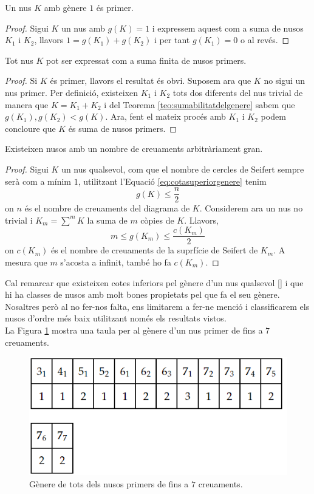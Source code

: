 \begin{corolary}
	Un nus $K$ amb gènere $1$ és primer.
\end{corolary}

\begin{proof}
	Sigui $K$ un nus amb $g(K)=1$ i expressem aquest com a suma de nusos $K_1$ i $K_2$, llavors $1=g(K_1)+g(K_2)$ i per tant $g(K_1)=0$ o al revés.
\end{proof}

\begin{corolary}
	Tot nus $K$ pot ser expressat com a suma finita de nusos primers.
\end{corolary}

\begin{proof}
	Si $K$ és primer, llavors el resultat és obvi. Suposem ara que $K$ no sigui un nus primer. Per definició, existeixen $K_1$ i $K_2$ tots dos diferents del nus trivial de manera que $K=K_1+K_2$ i del Teorema \ref{teo:sumabilitatdelgenere} sabem que $g(K_1),g(K_2)<g(K)$. Ara, fent el mateix procés amb $K_1$ i $K_2$ podem concloure que $K$ és suma de nusos primers.
\end{proof}

\begin{corolary}
	Existeixen nusos amb un nombre de creuaments arbitràriament gran.
\end{corolary}

\begin{proof}
	Sigui $K$ un nus qualsevol, com que el nombre de cercles de Seifert sempre serà com a mínim $1$, utilitzant l'Equació \ref{eq:cotasuperiorgenere} tenim $$g(K)\leq \frac{n}{2}$$ on $n$ és el nombre de creuaments del diagrama de $K$. Considerem ara un nus no trivial i $K_m=\sum^{m}K$ la suma de $m$ còpies de $K$. Llavors, $$m\leq g(K_m)\leq \frac{c(K_m)}{2}$$ on $c(K_m)$ és el nombre de creuaments de la suprfície de Seifert de $K_m$. A mesura que $m$ s'acosta a infinit, també ho fa $c(K_m)$.
\end{proof}

Cal remarcar que existeixen cotes inferiors pel gènere d'un nus qualsevol [\cite{lowerbound}] i que hi ha classes de nusos amb molt bones propietats pel que fa el seu gènere. Nosaltres però al no fer-nos falta, ens limitarem a fer-ne menció i classificarem els nusos d'ordre més baix utilitzant només els resultats vistos.\\

La Figura \ref{fig:genus} mostra una taula per al gènere d'un nus primer de fins a $7$ creuaments.

\begin{figure}
	\centering
	\includegraphics[width=\linewidth]{img/genus.png}
	\caption{Gènere de tots dels nusos primers de fins a $7$ creuaments.}\label{fig:genus}
\end{figure}